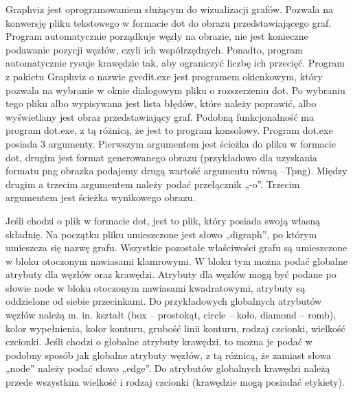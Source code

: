 


Graphviz\cite{Graphviz} jest oprogramowaniem służącym do wizualizacji grafów. Pozwala na konwersję pliku tekstowego w formacie dot do obrazu przedstawiającego graf. 
Program automatycznie porządkuje węzły na obrazie, nie jest konieczne podawanie pozycji węzłów, czyli ich współrzędnych. Ponadto, program automatycznie rysuje krawędzie tak, aby ograniczyć liczbę ich przecięć. Program z pakietu Graphviz o nazwie gvedit.exe jest programem okienkowym, który pozwala na wybranie w oknie dialogowym pliku o rozszerzeniu dot. Po wybraniu tego pliku albo wypisywana jest lista błędów, które należy poprawić, albo wyświetlany jest obraz przedstawiający graf. Podobną funkcjonalność ma program dot.exe, z tą różnicą, że jest to program konsolowy. Program dot.exe posiada 3 argumenty. Pierwszym argumentem jest ścieżka do pliku w formacie dot, drugim jest format generowanego obrazu (przykładowo dla uzyskania formatu png obrazka podajemy drugą wartość argumentu równą –Tpng). Między drugim a trzecim argumentem należy podać przełącznik „-o”. Trzecim argumentem jest ścieżka wynikowego obrazu. 

Jeśli chodzi o plik w formacie dot, jest to plik, który posiada swoją własną składnię. Na początku pliku umieszczone jest słowo „digraph”, po którym umieszcza się nazwę grafu. Wszystkie pozostałe właściwości grafu są umieszczone w bloku otoczonym nawiasami klamrowymi. W bloku tym można podać globalne atrybuty dla węzłów oraz krawędzi. Atrybuty dla węzłów mogą być podane po słowie node w bloku otoczonym nawiasami kwadratowymi, atrybuty są oddzielone od siebie przecinkami. Do przykładowych globalnych atrybutów węzłów należą m. in. kształt (box – prostokąt, circle – koło, diamond – romb), kolor wypełnienia, kolor konturu, grubość linii konturu, rodzaj czcionki, wielkość czcionki. Jeśli chodzi o globalne atrybuty krawędzi, to można je podać w podobny sposób jak globalne atrybuty węzłów, z tą różnicą, że zamiast słowa „node” należy podać słowo „edge”. Do atrybutów globalnych krawędzi należą przede wszystkim wielkość i rodzaj czcionki (krawędzie mogą posiadać etykiety). 

